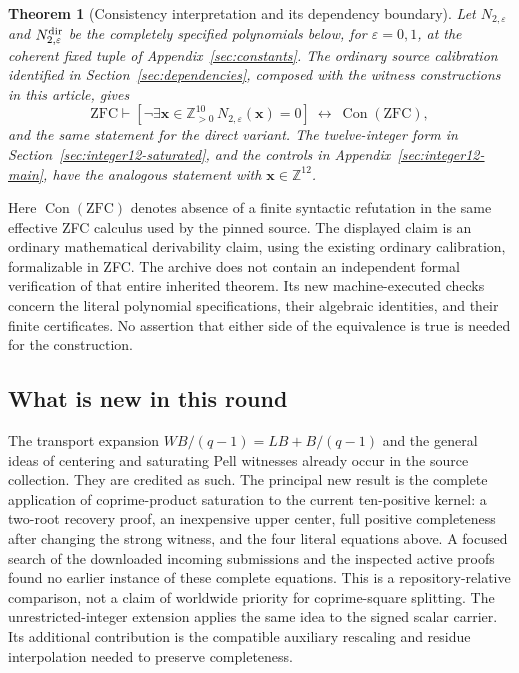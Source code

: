 \documentclass[11pt,letterpaper]{article}
\newtheorem{theorem}{Theorem}[section]
\theoremstyle{remark}\newtheorem{remark}[theorem]{Remark}
\newcommand{\Z}{\mathbb Z}\newcommand{\N}{\mathbb N}
\newcommand{\Con}{\operatorname{Con}}\newcommand{\ZFC}{\mathrm{ZFC}}
\begin{document}
\begin{theorem}[Consistency interpretation and its dependency boundary]
Let $N_{2,\varepsilon}$ and $N^{\rm dir}_{2,\varepsilon}$ be the completely
specified polynomials below, for $\varepsilon=0,1$, at the coherent fixed
tuple of Appendix~\ref{sec:constants}.  The ordinary source calibration
identified in Section~\ref{sec:dependencies}, composed with the witness
constructions in this article, gives
\[
 \ZFC\vdash
 \left[\neg\exists\mathbf x\in\Z_{>0}^{10}\,
             N_{2,\varepsilon}(\mathbf x)=0\right]
       \ \longleftrightarrow\ \Con(\ZFC),
\]
and the same statement for the direct variant.  The twelve-integer
form in Section~\ref{sec:integer12-saturated}, and the controls in
Appendix~\ref{sec:integer12-main}, have the analogous statement with
$\mathbf x\in\Z^{12}$.
\end{theorem}

Here $\Con(\ZFC)$ denotes absence of a finite syntactic refutation in the
same effective ZFC calculus used by the pinned source.  The displayed
claim is an ordinary mathematical derivability claim, using the existing
ordinary calibration, formalizable in ZFC.  The archive does not contain an
independent formal verification of that entire inherited theorem.  Its
new machine-executed checks concern the literal polynomial specifications,
their algebraic identities, and their finite certificates.  No assertion
that either side of the equivalence is true is needed for the construction.

\subsection{What is new in this round}

The transport expansion $W B/(q-1)=LB+B/(q-1)$ and the general ideas of
centering and saturating Pell witnesses already occur in the source
collection.  They are credited as such.  The principal new result is the
complete application of coprime-product saturation to the current
ten-positive kernel: a two-root recovery proof, an inexpensive upper
center, full positive completeness after changing the strong witness,
and the four literal equations above.  A focused search of the downloaded
incoming submissions and the inspected active proofs found no earlier
instance of these complete equations.  This is a repository-relative
comparison, not a claim of worldwide priority for coprime-square splitting.
The unrestricted-integer extension applies the same idea to the signed
scalar carrier.  Its additional contribution is the compatible auxiliary
rescaling and residue interpolation needed to preserve completeness.
\end{document}
